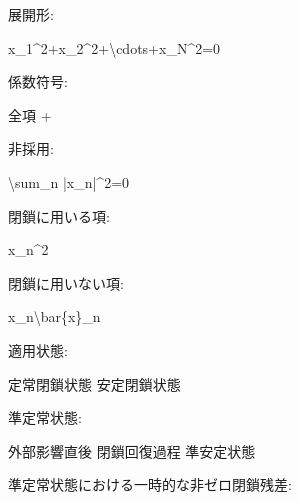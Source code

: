 \documentclass[
  a4paper]{ltjsarticle}
\newenvironment{Shaded}{}{}
\newcommand{\NormalTok}[1]{#1}
\begin{document}
展開形:

\begin{Shaded}
\begin{Highlighting}[]
\NormalTok{x\_1\^{}2+x\_2\^{}2+\textbackslash{}cdots+x\_N\^{}2=0}
\end{Highlighting}
\end{Shaded}

係数符号:

\begin{Shaded}
\begin{Highlighting}[]
\NormalTok{全項 +}
\end{Highlighting}
\end{Shaded}

非採用:

\begin{Shaded}
\begin{Highlighting}[]
\NormalTok{\textbackslash{}sum\_n |x\_n|\^{}2=0}
\end{Highlighting}
\end{Shaded}

閉鎖に用いる項:

\begin{Shaded}
\begin{Highlighting}[]
\NormalTok{x\_n\^{}2}
\end{Highlighting}
\end{Shaded}

閉鎖に用いない項:

\begin{Shaded}
\begin{Highlighting}[]
\NormalTok{x\_n\textbackslash{}bar\{x\}\_n}
\end{Highlighting}
\end{Shaded}

適用状態:

\begin{Shaded}
\begin{Highlighting}[]
\NormalTok{定常閉鎖状態}
\NormalTok{安定閉鎖状態}
\end{Highlighting}
\end{Shaded}

準定常状態:

\begin{Shaded}
\begin{Highlighting}[]
\NormalTok{外部影響直後}
\NormalTok{閉鎖回復過程}
\NormalTok{準安定状態}
\end{Highlighting}
\end{Shaded}

準定常状態における一時的な非ゼロ閉鎖残差:
\end{document}
